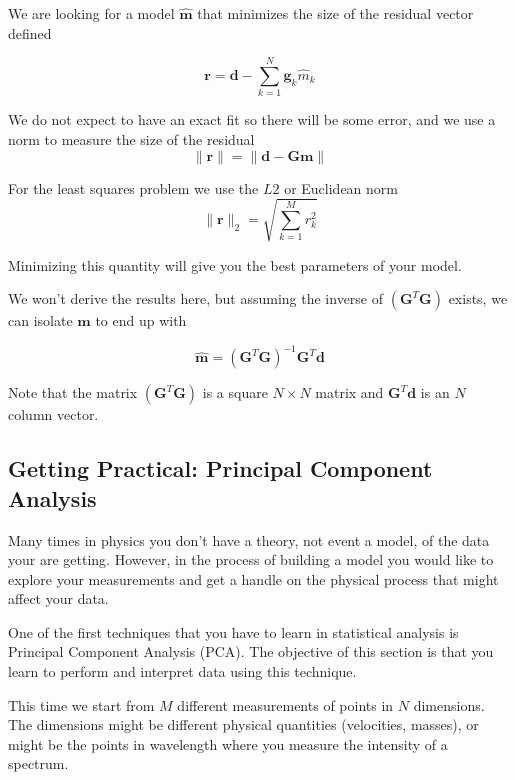 \documentclass{article}
\begin{document}
We are looking for a model $\hat{\mathbf{m}}$ that minimizes the size of the residual vector defined

\begin{equation}
\mathbf{r} = \mathbf{d} -  \sum_{k=1}^{N} \mathbf{g}_k \hat{m}_k
\end{equation}

We do not expect to have an exact fit so there will be some error, and we use a norm to measure the size of the residual
\begin{equation}
\| \mathbf{r} \| = \| \mathbf{d} - \mathbf{Gm} \|
\end{equation}

For the least squares problem we use the $L2$ or Euclidean norm 
\begin{equation}
\| \mathbf{r} \|_2 = \sqrt{\sum_{k=1}^M r^2_k}
\end{equation}

Minimizing this quantity will give you the best parameters of your model.


We won't derive the results here, but assuming the inverse of $(\mathbf{G}^T \mathbf{G})$ exists, we can isolate $\hat{\mathbf{m}}$ to end up with

\begin{equation}
\hat{\mathbf{m}} = {(\mathbf{G}^T \mathbf{G})}^{-1}\mathbf{G}^T \mathbf{d}   
\end{equation}

Note that the matrix ${(\mathbf{G}^T \mathbf{G})}$ is a square $N\times N$ matrix and $\mathbf{G}^T\mathbf{d}$ is an $N$ column vector. 

\subsection{Getting Practical: Principal Component Analysis}

Many times in physics you don't have a theory, not event a model, of the data your are getting. However, in the process of building a model you would like to explore your measurements and get a handle on the physical process that might affect your data.

One of the first techniques that you have to learn in statistical analysis is Principal Component Analysis (PCA). The objective of this section is that you learn to perform and interpret data using this technique.

This time we start from $M$ different measurements of points in $N$ dimensions. The dimensions might be different physical quantities (velocities, masses), or might be the points in wavelength where you measure the intensity of a spectrum.
\end{document}
